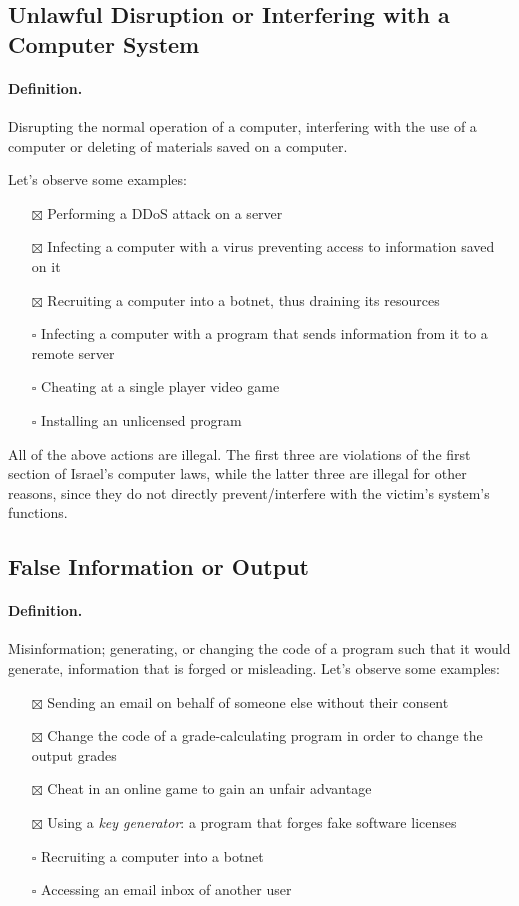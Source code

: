 \subsection{Unlawful Disruption or Interfering with a Computer System}

\paragraph{Definition.} Disrupting the normal operation of a computer, interfering with the use of a computer or deleting of materials saved on a computer.

Let's observe some examples:
\begin{itemize}
    \item[$\boxtimes$] Performing a DDoS attack on a server
    \item[$\boxtimes$] Infecting a computer with a virus preventing access to information saved on it
    \item[$\boxtimes$] Recruiting a computer into a botnet, thus draining its resources
    \item[$\square$] Infecting a computer with a program that sends information from it to a remote server
    \item[$\square$] Cheating at a single player video game
    \item[$\square$] Installing an unlicensed program
\end{itemize}

All of the above actions are illegal. The first three are violations of the first section of Israel's computer laws, while the latter three are illegal for other reasons, since they do not directly prevent/interfere with the victim's system's functions.

\subsection{False Information or Output}

\paragraph{Definition.} Misinformation; generating, or changing the code of a program such that it would generate, information that is forged or misleading.
Let's observe some examples:
\begin{itemize}
    \item[$\boxtimes$] Sending an email on behalf of someone else without their consent
    \item[$\boxtimes$] Change the code of a grade-calculating program in order to change the output grades
    \item[$\boxtimes$] Cheat in an online game to gain an unfair advantage
    \item[$\boxtimes$] Using a \textit{key generator}: a program that forges fake software licenses
    \item[$\square$] Recruiting a computer into a botnet
    \item[$\square$] Accessing an email inbox of another user
\end{itemize}

